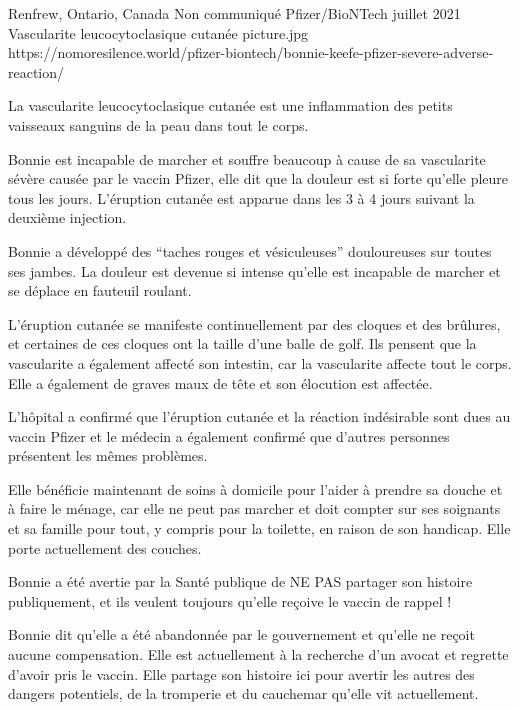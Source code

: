 {Renfrew, Ontario, Canada}
{Non communiqué}
{Pfizer/BioNTech}
{juillet 2021}
{Vascularite leucocytoclasique cutanée}
{picture.jpg}
{https://nomoresilence.world/pfizer-biontech/bonnie-keefe-pfizer-severe-adverse-reaction/}
{

La vascularite leucocytoclasique cutanée est une inflammation des petits
vaisseaux sanguins de la peau dans tout le corps.

Bonnie est incapable de marcher et souffre beaucoup à cause de sa vascularite
sévère causée par le vaccin Pfizer, elle dit que la douleur est si forte qu'elle
pleure tous les jours. L'éruption cutanée est apparue dans les 3 à 4 jours
suivant la deuxième injection.

Bonnie a développé des “taches rouges et vésiculeuses” douloureuses sur toutes
ses jambes. La douleur est devenue si intense qu'elle est incapable de marcher
et se déplace en fauteuil roulant.

L'éruption cutanée se manifeste continuellement par des cloques et des brûlures,
et certaines de ces cloques ont la taille d'une balle de golf. Ils pensent que
la vascularite a également affecté son intestin, car la vascularite affecte tout
le corps. Elle a également de graves maux de tête et son élocution est affectée.

L'hôpital a confirmé que l'éruption cutanée et la réaction indésirable sont dues
au vaccin Pfizer et le médecin a également confirmé que d'autres personnes
présentent les mêmes problèmes.

Elle bénéficie maintenant de soins à domicile pour l'aider à prendre sa douche
et à faire le ménage, car elle ne peut pas marcher et doit compter sur ses
soignants et sa famille pour tout, y compris pour la toilette, en raison de son
handicap. Elle porte actuellement des couches.

Bonnie a été avertie par la Santé publique de NE PAS partager son histoire
publiquement, et ils veulent toujours qu'elle reçoive le vaccin de rappel !

Bonnie dit qu'elle a été abandonnée par le gouvernement et qu'elle ne reçoit
aucune compensation. Elle est actuellement à la recherche d'un avocat et
regrette d'avoir pris le vaccin. Elle partage son histoire ici pour avertir les
autres des dangers potentiels, de la tromperie et du cauchemar qu'elle vit
actuellement.

}
